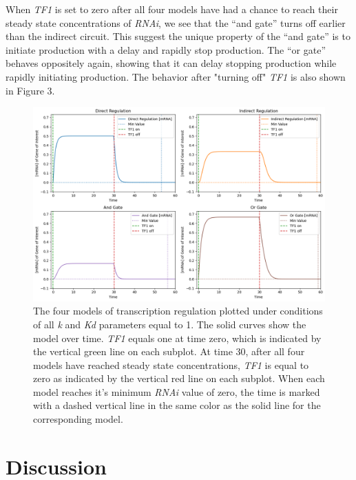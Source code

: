 \documentclass{article}
\begin{document}
When \textit{TF1} is set to zero after all four models have had a chance to reach their steady state concentrations of \textit{RNAi}, we see that the ``and gate'' turns off earlier than the indirect circuit. This suggest the unique property of the ``and gate'' is to initiate production with a delay and rapidly stop production. The ``or gate'' behaves oppositely again, showing that it can delay stopping production while rapidly initiating production. The behavior after "turning off" \textit{TF1} is also shown in Figure 3. 


\begin{figure}[h]
    \centering
    \includegraphics[width=1\textwidth]{figure3.png}
    \caption{The four models of transcription regulation plotted under conditions of all \textit{k} and \textit{Kd} parameters equal to 1. The solid curves show the model over time. \textit{TF1} equals one at time zero, which is indicated by the vertical green line on each subplot. At time 30, after all four models have reached steady state concentrations, \textit{TF1} is equal to zero as indicated by the vertical red line on each subplot. When each model reaches it's minimum \textit{RNAi} value of zero, the time is marked with a dashed vertical line in the same color as the solid line for the corresponding model.}
\end{figure}

\section{Discussion}
\end{document}
